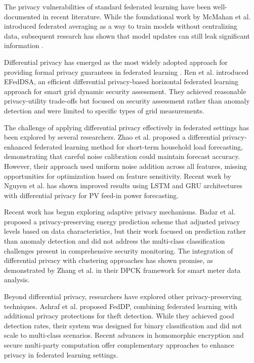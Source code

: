 \documentclass{ieeeaccess}
\theoremstyle{definition}
\begin{document}
The privacy vulnerabilities of standard federated learning have been well-documented in recent literature. While the foundational work by McMahan et al. \cite{mcmahan2017communication} introduced federated averaging as a way to train models without centralizing data, subsequent research has shown that model updates can still leak significant information \cite{li2020federated}.

Differential privacy has emerged as the most widely adopted approach for providing formal privacy guarantees in federated learning \cite{dwork2014algorithmic}. Ren et al. \cite{ren2023efeddsa} introduced EFedDSA, an efficient differential privacy-based horizontal federated learning approach for smart grid dynamic security assessment. They achieved reasonable privacy-utility trade-offs but focused on security assessment rather than anomaly detection and were limited to specific types of grid measurements.

The challenge of applying differential privacy effectively in federated settings has been explored by several researchers. Zhao et al. \cite{zhao2021differential} proposed a differential privacy-enhanced federated learning method for short-term household load forecasting, demonstrating that careful noise calibration could maintain forecast accuracy. However, their approach used uniform noise addition across all features, missing opportunities for optimization based on feature sensitivity. Recent work by Nguyen et al. \cite{nguyen2024enhancing} has shown improved results using LSTM and GRU architectures with differential privacy for PV feed-in power forecasting.

Recent work has begun exploring adaptive privacy mechanisms. Badar et al. \cite{badar2023privacy} proposed a privacy-preserving energy prediction scheme that adjusted privacy levels based on data characteristics, but their work focused on prediction rather than anomaly detection and did not address the multi-class classification challenges present in comprehensive security monitoring. The integration of differential privacy with clustering approaches has shown promise, as demonstrated by Zhang et al. \cite{zhang2025dpck} in their DPCK framework for smart meter data analysis.

Beyond differential privacy, researchers have explored other privacy-preserving techniques. Ashraf et al. \cite{ashraf2022feddp} proposed FedDP, combining federated learning with additional privacy protections for theft detection. While they achieved good detection rates, their system was designed for binary classification and did not scale to multi-class scenarios. Recent advances in homomorphic encryption \cite{choi2024fednic, islam2025smart} and secure multi-party computation \cite{liu2024privacy} offer complementary approaches to enhance privacy in federated learning settings.
\end{document}
